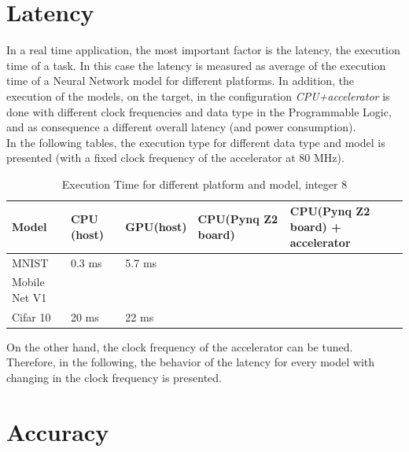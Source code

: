 \section{Latency}
In a real time application, the most important factor is the latency, the execution time of a task.
In this case the latency is measured as average of the execution time of a Neural Network model for different platforms. In addition, the execution of the models, on the target, in the configuration \textit{CPU+accelerator} is done with different clock frequencies and data type in the Programmable Logic, and as consequence a different overall latency (and power consumption).\\
In the following tables, the execution type for different data type and model is presented (with a fixed clock frequency of the accelerator at 80 MHz).
\begin{center}
\begin{table}[!htbp]
\centering
\captionsetup{justification=centering}
\begin{tabular}{ |p{2.5cm}||p{2.5cm}|p{2.5cm}|p{2.5cm}|p{2.5cm}| }
\hline
Model & CPU (host)\protect\footnotemark[1] & GPU(host)\protect\footnotemark[1] & CPU(Pynq Z2 board)\protect\footnotemark[3] & CPU(Pynq Z2 board) + accelerator \\
\hline
MNIST & 0.3 ms & 5.7 ms &\\
\hline
Mobile Net V1& & &\\
\hline
Cifar 10& 20 ms & 22 ms&\\
\hline
\end{tabular}
\caption{Execution Time for different platform and model, integer 8}
\label{table:moplatint8}
\end{table}
\end{center}


On the other hand, the clock frequency of the accelerator can be tuned. Therefore, in the following, the behavior of the latency for every model with changing in the clock frequency is presented.

\newpage
\section{Accuracy}

